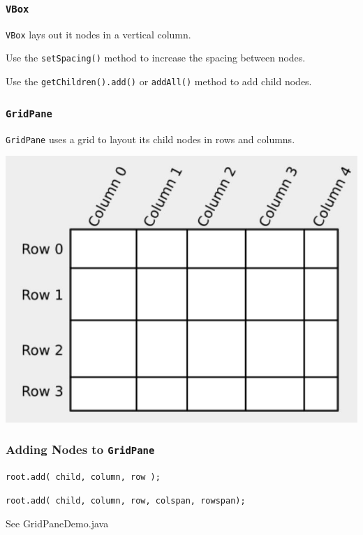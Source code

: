 \documentclass{beamer}
\newcommand{\mil}[1]{\texttt{#1}}
\begin{document}
\begin{frame}
    
    \frametitle{\mil{VBox}}
    
    \mil{VBox} lays out it nodes in a vertical column.
    
    \bigskip
    
    Use the \mil{setSpacing()} method to increase the spacing between nodes.
    
    \bigskip
    
    Use the \mil{getChildren().add()} or \mil{addAll()} method to add child nodes.    
\end{frame}

\begin{frame}
    
    \frametitle{\mil{GridPane}}
    
    \mil{GridPane} uses a grid to layout its child nodes in rows and columns.
    
    \begin{center}
        \includegraphics[scale=0.4]{gridpane.jpg}
    \end{center}
\end{frame}

\begin{frame}
    \frametitle{Adding Nodes to \mil{GridPane}}
    
    \mil{root.add( child, column, row );}
    
    \bigskip
    
    \mil{root.add( child, column, row, colspan, rowspan);}
    
    \bigskip
    
    See GridPaneDemo.java
    
\end{frame}
\end{document}
